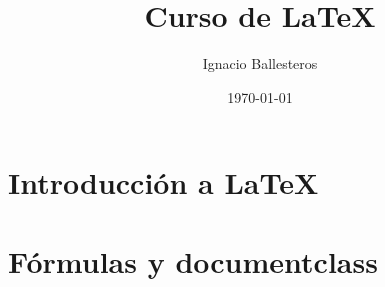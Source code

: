 \documentclass[11pt,twocolumn]{report}
\title{Curso de \LaTeX}
\author{Ignacio Ballesteros}
\date{\today}
\begin{document}
\maketitle
\tableofcontents

\chapter{Introducción a LaTeX}
\label{chap:Introduccion}

\chapter{Fórmulas y documentclass}
\end{document}
